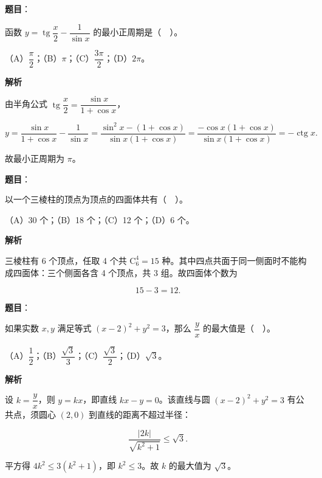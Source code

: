 \begin{answer}

\textbf{题目}：

函数 $y=\operatorname{tg}\dfrac{x}{2}-\dfrac{1}{\sin x}$ 的最小正周期是（　）。

（A）$\dfrac{\pi}{2}$；（B）$\pi$；（C）$\dfrac{3\pi}{2}$；（D）$2\pi$。

\textbf{解析}

由半角公式 $\operatorname{tg}\dfrac{x}{2}=\dfrac{\sin x}{1+\cos x}$，

\nopagebreak[4]
\[
y=\frac{\sin x}{1+\cos x}-\frac{1}{\sin x}
=\frac{\sin^2x-(1+\cos x)}{\sin x(1+\cos x)}
=\frac{-\cos x(1+\cos x)}{\sin x(1+\cos x)}
=-\operatorname{ctg}x.
\]

故最小正周期为 $\pi$。


\end{answer}
\begin{answer}

\textbf{题目}：

以一个三棱柱的顶点为顶点的四面体共有（　）。

（A）30 个；（B）18 个；（C）12 个；（D）6 个。

\textbf{解析}

三棱柱有 6 个顶点，任取 4 个共 $\mathrm{C}_6^4=15$ 种。其中四点共面于同一侧面时不能构成四面体：三个侧面各含 4 个顶点，共 3 组。故四面体个数为

\nopagebreak[4]
\[
15-3=12.
\]


\end{answer}
\begin{answer}

\textbf{题目}：

如果实数 $x,y$ 满足等式 $(x-2)^2+y^2=3$，那么 $\dfrac{y}{x}$ 的最大值是（　）。

（A）$\dfrac12$；（B）$\dfrac{\sqrt3}{3}$；（C）$\dfrac{\sqrt3}{2}$；（D）$\sqrt3$。

\textbf{解析}

设 $k=\dfrac{y}{x}$，则 $y=kx$，即直线 $kx-y=0$。该直线与圆 $(x-2)^2+y^2=3$ 有公共点，须圆心 $(2,0)$ 到直线的距离不超过半径：

\nopagebreak[4]
\[
\frac{|2k|}{\sqrt{k^2+1}}\le\sqrt3.
\]

平方得 $4k^2\le 3(k^2+1)$，即 $k^2\le 3$。故 $k$ 的最大值为 $\sqrt3$。


\end{answer}


